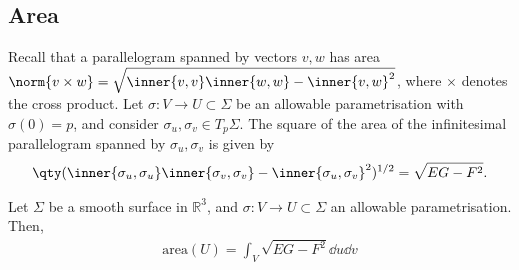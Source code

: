 \subsection{Area}
Recall that a parallelogram spanned by vectors $v, w$ has area \\$\norm{v \times w} = \sqrt{\inner{v,v}\inner{w,w} - \inner{v,w}^2}$, where $\times$ denotes the cross product.
Let $\sigma \colon V \to U \subset \Sigma$ be an allowable parametrisation with $\sigma(0) = p$, and consider $\sigma_u, \sigma_v \in T_p \Sigma$.
The square of the area of the infinitesimal parallelogram spanned by $\sigma_u, \sigma_v$ is given by
\begin{align*}
	\qty(\inner{\sigma_u, \sigma_u}\inner{\sigma_v, \sigma_v} - \inner{\sigma_u, \sigma_v}^2)^{1 / 2} = \sqrt{EG - F^2}.
\end{align*}

\begin{definition}[Area]
	Let $\Sigma$ be a smooth surface in $\mathbb R^3$, and $\sigma \colon V \to U \subset \Sigma$ an allowable parametrisation.
	Then,
	\begin{align*}
		\mathrm{area}(U) = \int_V \sqrt{EG - F^2} \dd{u}\dd{v}
	\end{align*}
\end{definition}

